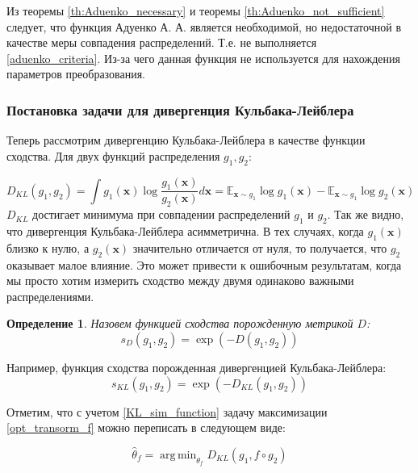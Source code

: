 \documentclass[12pt]{extarticle}
\newtheorem{definition}{Определение}
\DeclareMathOperator*{\argmin}{arg\,min}
\newcommand{\bfx}{\mathbf{x}}
\newcommand{\expectation}{\mathbb{E}}
\begin{document}
Из теоремы \ref{th:Aduenko_necessary} и теоремы \ref{th:Aduenko_not_sufficient} следует, что функция Адуенко А. А. является необходимой, но недостаточной в качестве меры совпадения распределений. Т.е. не выполняется \eqref{aduenko_criteria}. Из-за чего данная функция не используется для нахождения параметров преобразования. 

\newpage
\subsubsection{Постановка задачи для дивергенция Кульбака-Лейблера}

Теперь рассмотрим дивергенцию Кульбака-Лейблера в качестве функции сходства. Для двух функций распределения $g_1, g_2$:

\begin{equation}
    \label{D_KL_intro}
    D_{KL} (g_1, g_2) = \int g_1(\bfx) \log \frac{g_1(\bfx)}{g_2(\bfx)}d\bfx = \expectation_{\bfx\sim g_1} \log g_1(\bfx) - \expectation_{\bfx\sim g_1} \log g_2(\bfx)
\end{equation}
$D_{KL}$ достигает минимума при совпадении распределений $g_1$ и $g_2$. Так же видно, что дивергенция Кульбака-Лейблера асимметрична. В тех случаях, когда $g_1(\bfx)$ близко к нулю, а $g_2(\bfx)$ значительно отличается от нуля, то получается, что $g_2$ оказывает малое влияние. Это может привести к ошибочным результатам, когда мы просто хотим измерить сходство между двумя одинаково важными распределениями.


\begin{definition}
    Назовем функцией сходства порожденную метрикой $D$:
    \begin{equation}
        \label{sim_funk_generated_by}
        s_D (g_1 , g_2 ) = \exp( - D (g_1 , g_2))
    \end{equation}
\end{definition}

Например, функция сходства порожденная дивергенцией Кульбака-Лейблера:
\begin{equation}
    \label{KL_sim_function}
    s_{KL} (g_1 , g_2) = \exp(-D_{KL}(g_1 , g_2))
\end{equation}

Отметим, что с учетом \eqref{KL_sim_function} задачу максимизации \eqref{opt_transorm_f} можно переписать в следующем виде:

$$\hat{\theta}_f = \argmin_{\theta_f} D_{KL} ( g_1,  f\circ g_2)$$
\end{document}

